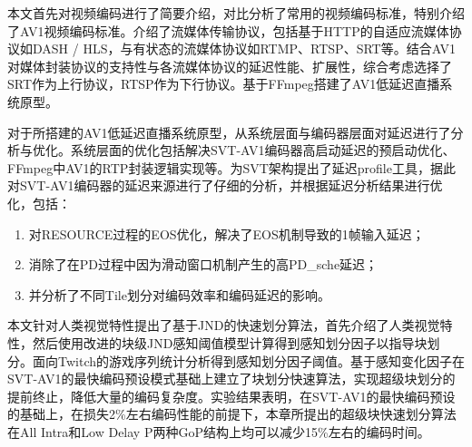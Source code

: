 
\begin{summary}

  本文首先对视频编码进行了简要介绍，对比分析了常用的视频编码标准，特别介绍了AV1视频编码标准。介绍了流媒体传输协议，包括基于HTTP的自适应流媒体协议如DASH / HLS，与有状态的流媒体协议如RTMP、RTSP、SRT等。结合AV1对媒体封装协议的支持性与各流媒体协议的延迟性能、扩展性，综合考虑选择了SRT作为上行协议，RTSP作为下行协议。基于FFmpeg搭建了AV1低延迟直播系统原型。

  对于所搭建的AV1低延迟直播系统原型，从系统层面与编码器层面对延迟进行了分析与优化。系统层面的优化包括解决SVT-AV1编码器高启动延迟的预启动优化、FFmpeg中AV1的RTP封装逻辑实现等。为SVT架构提出了延迟profile工具，据此对SVT-AV1编码器的延迟来源进行了仔细的分析，并根据延迟分析结果进行优化，包括：
  \begin{enumerate}
  	\item 对RESOURCE过程的EOS优化，解决了EOS机制导致的1帧输入延迟；
  	\item 消除了在PD过程中因为滑动窗口机制产生的高PD\_sche延迟；
  	\item 并分析了不同Tile划分对编码效率和编码延迟的影响。
  \end{enumerate}

  本文针对人类视觉特性提出了基于JND的快速划分算法，首先介绍了人类视觉特性，然后使用改进的块级JND感知阈值模型计算得到感知划分因子以指导块划分。面向Twitch的游戏序列统计分析得到感知划分因子阈值。基于感知变化因子在SVT-AV1的最快编码预设模式基础上建立了块划分快速算法，实现超级块划分的提前终止，降低大量的编码复杂度。实验结果表明，在SVT-AV1的最快编码预设的基础上，在损失2\%左右编码性能的前提下，本章所提出的超级块快速划分算法在All Intra和Low Delay P两种GoP结构上均可以减少15\%左右的编码时间。


\end{summary}
